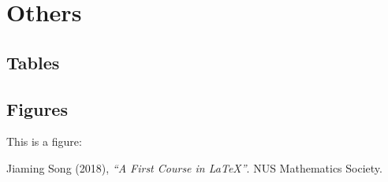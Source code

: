 \documentclass{article}
\begin{document}
	\newpage
	\section{Others}
		\subsection{Tables}
		\subsection{Figures}
			This is a figure:
			\begin{figure}[H]
			\end{figure}


	\begin{thebibliography}{100}
		 Jiaming Song (2018), \emph{``A First Course in \LaTeX{}''}. NUS Mathematics Society.
	\end{thebibliography}
\end{document}
